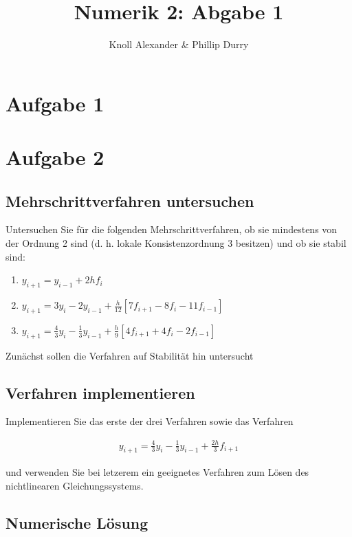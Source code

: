 \documentclass{article}
\author{Knoll Alexander & Phillip Durry}
\title{Numerik 2: Abgabe 1}
\begin{document}
\maketitle
\newpage
\tableofcontents
\newpage

\section{Aufgabe 1}

\section{Aufgabe 2}

	\subsection{Mehrschrittverfahren untersuchen}
	
		Untersuchen Sie für die folgenden Mehrschrittverfahren, ob sie mindestens von der Ordnung 2
		sind (d. h. lokale Konsistenzordnung 3 besitzen) und ob sie stabil sind:
	
		\begin{enumerate}[label=(\alph*)]
			\item  $y_{i+1} = y_{i-1} + 2hf_{i}$ 
			\item  $y_{i+1}  = 3y_{i} - 2y_{i-1} + \frac{h}{12}[7f_{i+1} - 8f_{i} - 11f_{i-1}] $ 
			\item  $y_{i+1} = \frac{4}{3}y_{i} - \frac{1}{3}y_{i-1} + \frac{h}{9}[4f_{i+1} + 4f_{i} - 2f_{i-1}]$ 
		\end{enumerate}
		
		Zunächst sollen die Verfahren auf Stabilität hin untersucht
	
	\subsection{Verfahren implementieren}
	
		Implementieren Sie das erste der drei Verfahren sowie das Verfahren
		
		\begin{align*}
			y_{i+1} = \frac{4}{3}y_{i} - \frac{1}{3}y_{i-1} + \frac{2h}{3}f_{i+1}
		\end{align*}
		
		und verwenden Sie bei letzerem ein geeignetes Verfahren zum Lösen des nichtlinearen Gleichungssystems.
		
	\subsection{Numerische Lösung}
	
\end{document}
